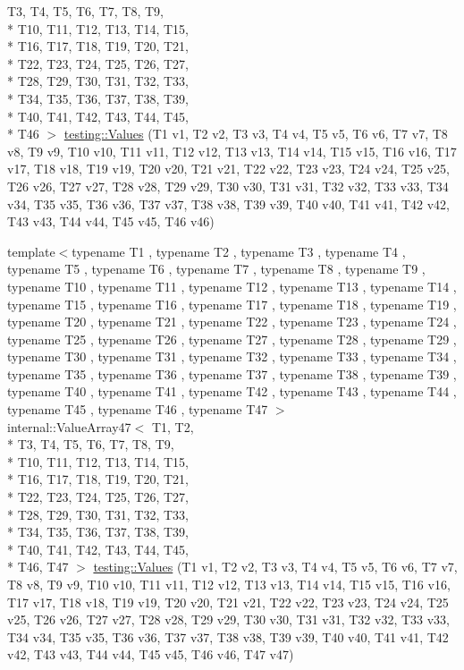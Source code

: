 \begin{DoxyCompactItemize}
T3, T4, T5, T6, T7, T8, T9, \\*
T10, T11, T12, T13, T14, T15, \\*
T16, T17, T18, T19, T20, T21, \\*
T22, T23, T24, T25, T26, T27, \\*
T28, T29, T30, T31, T32, T33, \\*
T34, T35, T36, T37, T38, T39, \\*
T40, T41, T42, T43, T44, T45, \\*
T46 $>$ \hyperlink{namespacetesting_a8f5536906a9d6780467c8ae53a420dad}{testing\-::\-Values} (T1 v1, T2 v2, T3 v3, T4 v4, T5 v5, T6 v6, T7 v7, T8 v8, T9 v9, T10 v10, T11 v11, T12 v12, T13 v13, T14 v14, T15 v15, T16 v16, T17 v17, T18 v18, T19 v19, T20 v20, T21 v21, T22 v22, T23 v23, T24 v24, T25 v25, T26 v26, T27 v27, T28 v28, T29 v29, T30 v30, T31 v31, T32 v32, T33 v33, T34 v34, T35 v35, T36 v36, T37 v37, T38 v38, T39 v39, T40 v40, T41 v41, T42 v42, T43 v43, T44 v44, T45 v45, T46 v46)
\item 
{\footnotesize template$<$typename T1 , typename T2 , typename T3 , typename T4 , typename T5 , typename T6 , typename T7 , typename T8 , typename T9 , typename T10 , typename T11 , typename T12 , typename T13 , typename T14 , typename T15 , typename T16 , typename T17 , typename T18 , typename T19 , typename T20 , typename T21 , typename T22 , typename T23 , typename T24 , typename T25 , typename T26 , typename T27 , typename T28 , typename T29 , typename T30 , typename T31 , typename T32 , typename T33 , typename T34 , typename T35 , typename T36 , typename T37 , typename T38 , typename T39 , typename T40 , typename T41 , typename T42 , typename T43 , typename T44 , typename T45 , typename T46 , typename T47 $>$ }\\internal\-::\-Value\-Array47$<$ T1, T2, \\*
T3, T4, T5, T6, T7, T8, T9, \\*
T10, T11, T12, T13, T14, T15, \\*
T16, T17, T18, T19, T20, T21, \\*
T22, T23, T24, T25, T26, T27, \\*
T28, T29, T30, T31, T32, T33, \\*
T34, T35, T36, T37, T38, T39, \\*
T40, T41, T42, T43, T44, T45, \\*
T46, T47 $>$ \hyperlink{namespacetesting_aba2697b2cd3e9d667ab3807022303240}{testing\-::\-Values} (T1 v1, T2 v2, T3 v3, T4 v4, T5 v5, T6 v6, T7 v7, T8 v8, T9 v9, T10 v10, T11 v11, T12 v12, T13 v13, T14 v14, T15 v15, T16 v16, T17 v17, T18 v18, T19 v19, T20 v20, T21 v21, T22 v22, T23 v23, T24 v24, T25 v25, T26 v26, T27 v27, T28 v28, T29 v29, T30 v30, T31 v31, T32 v32, T33 v33, T34 v34, T35 v35, T36 v36, T37 v37, T38 v38, T39 v39, T40 v40, T41 v41, T42 v42, T43 v43, T44 v44, T45 v45, T46 v46, T47 v47)

\end{DoxyCompactItemize}

